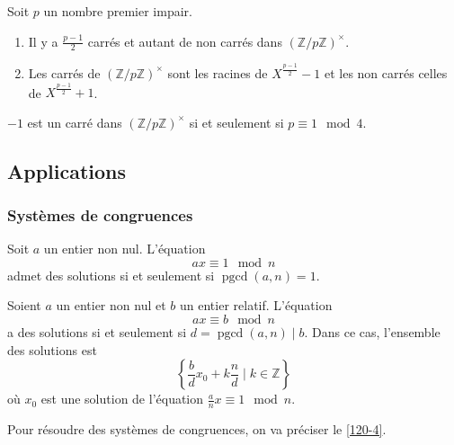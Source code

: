 	Soit $p$ un nombre premier impair.

	\begin{theorem}
		\begin{enumerate}[label=(\roman*)]
			\item Il y a $\frac{p-1}{2}$ carrés et autant de non carrés dans $(\mathbb{Z}/p\mathbb{Z})^\times$.
			\item Les carrés de $(\mathbb{Z}/p\mathbb{Z})^\times$ sont les racines de $X^{\frac{p-1}{2}} - 1$ et les non carrés celles de $X^{\frac{p-1}{2}} + 1$.
		\end{enumerate}
	\end{theorem}

	\begin{corollary}
		$-1$ est un carré dans $(\mathbb{Z}/p\mathbb{Z})^\times$ si et seulement si $p \equiv 1 \mod 4$.
	\end{corollary}

	\subsection{Applications}

	\subsubsection{Systèmes de congruences}


	\begin{proposition}
		Soit $a$ un entier non nul. L'équation
		\[ ax \equiv 1 \mod n \]
		admet des solutions si et seulement si $\operatorname{pgcd}(a,n) = 1$.
	\end{proposition}

	\begin{corollary}
		Soient $a$ un entier non nul et $b$ un entier relatif. L'équation
		\[ ax \equiv b \mod n \]
		a des solutions si et seulement si $d = \operatorname{pgcd}(a,n) \mid b$. Dans ce cas, l'ensemble des solutions est
		\[ \left\{ \frac{b}{d}x_0 + k\frac{n}{d} \mid k \in \mathbb{Z} \right\} \]
		où $x_0$ est une solution de l'équation $\frac{a}{n}x \equiv 1 \mod n$.
	\end{corollary}


	Pour résoudre des systèmes de congruences, on va préciser le \cref{120-4}.

